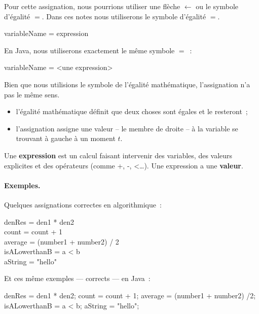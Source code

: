 			Pour cette assignation, nous pourrions utiliser une flèche
			$\leftarrow$ ou le symbole d'égalité $=$. Dans ces notes nous
			utiliserons le symbole d'égalité $=$.

			\begin{langagenaturel}
				variableName = expression
			\end{langagenaturel}

			En Java, nous utiliserons exactement le même symbole $=$~:

			\begin{java}
variableName = <une expression>				
			\end{java}

			Bien que nous utilisions le symbole de l'égalité mathématique, 
			l'assignation n'a pas le même sens. 

			\begin{itemize}
				\item l'égalité mathématique définit que deux choses sont égales 
					et le resteront~;
				\item l'assignation assigne une valeur -- le membre de droite -- 
					à la variable se trouvant à gauche à un moment $t$.
			\end{itemize}
				
			Une \textbf{expression} est un calcul faisant
			intervenir des variables, des valeurs explicites et des opérateurs
			(comme +, -, <\dots).  Une expression a une \textbf{valeur}.
					
			\paragraph{Exemples.}
				
				Quelques assignations correctes en algorithmique~:
				
				\begin{langagenaturel}
					 denRes = den1 * den2\\
					 count = count + 1\\
					 average = (number1 + number2) / 2\\
					 isALowerthanB = a < b \\
					 aString = "hello"\\
				\end{langagenaturel}

				Et ces même exemples — corrects — en Java~:

				\begin{java}
denRes = den1 * den2;
count = count + 1;
average = (number1 + number2) /2;
isALowerthanB = a < b;
aString = "hello";
				\end{java}
				
